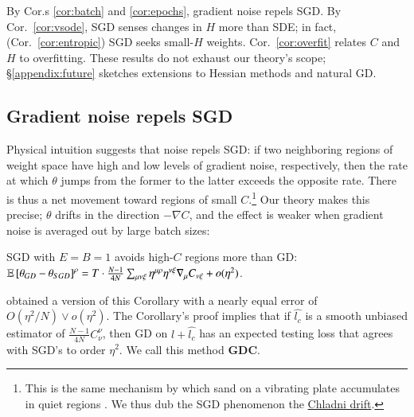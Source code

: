 
        By Cor.s \ref{cor:batch} and \ref{cor:epochs}, gradient noise repels SGD.
        By Cor.\ \ref{cor:vsode}, SGD senses changes in $H$ more than
            SDE; in fact, (Cor.\ \ref{cor:entropic}) SGD seeks small-$H$
            weights.
        Cor.\ \ref{cor:overfit} relates
            $C$ and $H$ to overfitting.  These
            results do not exhaust our theory's scope;
            \S\ref{appendix:future} sketches 
            extensions to Hessian methods and natural GD.

        \subsection{Gradient noise repels SGD}\label{subsect:epochs-batch}
            Physical intuition suggests that noise repels SGD: if two
            neighboring regions of weight space have high and low levels of
            gradient noise, respectively, then
            the rate at which
            $\theta$ jumps from the former to the latter
            exceeds%
            the opposite rate.
            There is thus a net movement toward regions of small $C$.\footnote{
                This is the same mechanism by which sand on a vibrating
                plate accumulates in quiet regions \citep{ch87}.  We thus dub
                the SGD phenomenon the
                \href{http://dataphys.org/list/chladni-plates/}{Chladni
                drift}.
            }
            Our theory makes this precise; $\theta$ drifts in the direction
            $-\nabla C$, and the effect is weaker when gradient noise is
            averaged out by large batch sizes:
            \begin{cor} \label{cor:batch}
                SGD with $E=B=1$ avoids high-$C$ regions more than GD:
                $
                    \mathbb{E}\left[\theta_{GD} - \theta_{SGD}\right]^\rho
                        =
                    T \cdot \frac{N-1}{4 N}
                    \sum_{\mu\nu\xi} \eta^{\mu\rho} \eta^{\nu\xi} \nabla_\mu C_{\nu\xi} + o(\eta^2)
                $.
            \end{cor}
            \noindent
            \cite{ro19} obtained a version of this Corollary with a nearly
            equal error of $O(\eta^2/N)\vee o(\eta^2)$.  The Corollary's proof
            implies that if $\hat{l_c}$ is a
            smooth unbiased estimator of $\frac{N-1}{4 N}
            C^{\nu}_{\nu}$, then GD on $l + \hat{l_c}$ has an expected testing
            loss that agrees with SGD's to order $\eta^2$.  We call this method
            \textbf{GDC}.

